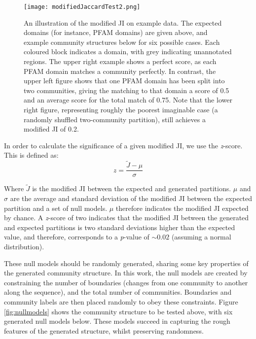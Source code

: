 \documentclass[a4paper,numbib, final, twoside, titelpage]{imaiai}%
\begin{document}
\begin{figure}[h]
    \begin{center}
        \texttt{[image: modifiedJaccardTest2.png]}
          \caption[Modified Jaccard Test]{An illustration of the modified JI on example data. The expected domains (for instance, PFAM domains) are given above, and example community structures below for six possible cases. Each coloured block indicates a domain, with grey indicating unannotated regions. The upper right example shows a perfect score, as each PFAM domain matches a community perfectly. In contrast, the upper left figure shows that one PFAM domain has been split into two communities, giving the matching to that domain a score of 0.5 and an average score for the total match of 0.75. Note that the lower right figure, representing roughly the poorest imaginable case (a randomly shuffled two-community partition), still achieves a modified JI of 0.2.}

  \label{fig:modifiedJaccardTest}
    \end{center}
\end{figure}
\newpage
In order to calculate the significance of a given modified JI, we use the \textit{z}-score. This is defined as:
\begin{equation*}
  z = \frac{\tilde{J} - \mu}{\sigma}
\end{equation*}

Where $\tilde{J}$ is the modified JI between the expected and generated partitions. $\mu$ and $\sigma$ are the average and standard deviation of the modified JI between the expected partition and a set of null models. $\mu$ therefore indicates the modified JI expected by chance. A \textit{z}-score of two indicates that the modified JI between the generated and expected partitions is two standard deviations higher than the expected value, and therefore, corresponds to a \textit{p}-value of $\sim0.02$ (assuming a normal distribution).

These null models should be randomly generated, sharing some key properties of the generated community structure. In this work, the null models are created by constraining the number of boundaries (changes from one community to another along the sequence), and the total number of communities. Boundaries and community labels are then placed randomly to obey these constraints. Figure \ref{fig:nullmodels} shows the community structure to be tested above, with six generated null models below. These models succeed in capturing the rough features of the generated structure, whilst preserving randomness.
\end{document}
